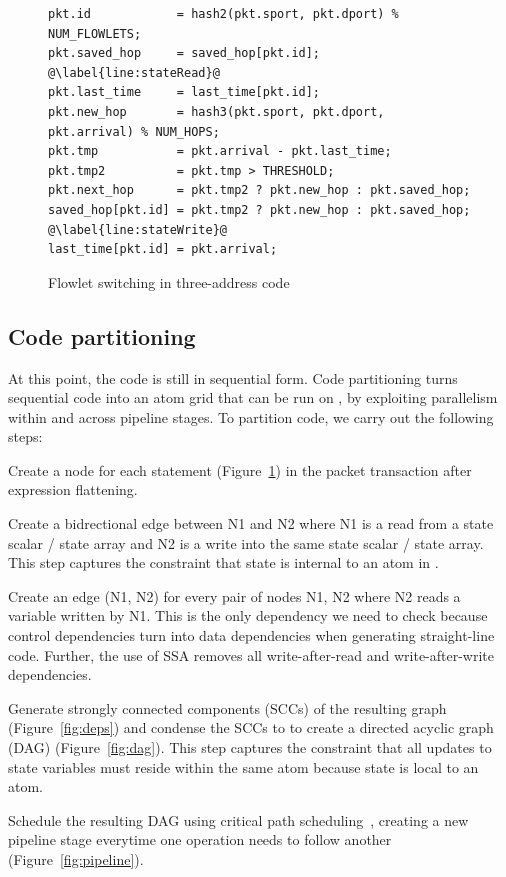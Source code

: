 \begin{figure}
\begin{lstlisting}[style=customc]
pkt.id            = hash2(pkt.sport, pkt.dport) % NUM_FLOWLETS;
pkt.saved_hop     = saved_hop[pkt.id]; @\label{line:stateRead}@
pkt.last_time     = last_time[pkt.id];
pkt.new_hop       = hash3(pkt.sport, pkt.dport, pkt.arrival) % NUM_HOPS;
pkt.tmp           = pkt.arrival - pkt.last_time;
pkt.tmp2          = pkt.tmp > THRESHOLD;
pkt.next_hop      = pkt.tmp2 ? pkt.new_hop : pkt.saved_hop;
saved_hop[pkt.id] = pkt.tmp2 ? pkt.new_hop : pkt.saved_hop; @\label{line:stateWrite}@
last_time[pkt.id] = pkt.arrival;
\end{lstlisting}
\caption{Flowlet switching in three-address code}
\label{fig:three_address}
\end{figure}

\subsection{Code partitioning}
\label{ss:partitioning}
At this point, the code is still in sequential form. Code partitioning
turns sequential code into an atom grid that can be run on \absmachine , by
exploiting parallelism within and across pipeline stages.
To partition code, we carry out the following steps:
\begin{CompactEnumerate}
  \item Create a node for each statement (Figure~\ref{fig:three_address}) in
    the packet transaction after expression flattening.
  \item Create a bidrectional edge between N1 and N2 where N1 is a read from a
    state scalar / state array and N2 is a write into the same state scalar /
    state array. This step captures the constraint that state is internal to an
    atom in \absmachine.
  \item Create an edge (N1, N2) for every pair of nodes N1, N2 where N2 reads
    a variable written by N1. This is the only dependency we need to check because
    control dependencies turn into data dependencies when generating straight-line
    code. Further, the use of SSA removes all write-after-read and write-after-write
    dependencies.
  \item Generate strongly connected components (SCCs) of the resulting graph
    (Figure~\ref{fig:deps}) and condense the SCCs to to create a directed
    acyclic graph (DAG) (Figure~\ref{fig:dag}). This step captures the
    constraint that all updates to state variables must reside within the same
    atom because state is local to an atom.
  \item Schedule the resulting DAG using critical path
    scheduling~\cite{crit_path_sched}, creating a new pipeline stage everytime
    one operation needs to follow another (Figure~\ref{fig:pipeline}).
\end{CompactEnumerate}

